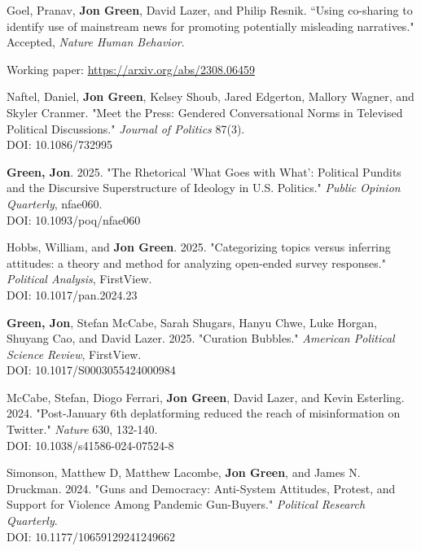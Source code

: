 \documentclass[letterpaper]{article}
\renewenvironment{itemize}{
  \begin{list}{}{
    \setlength{\leftmargin}{1.5em}
  }
}{
  \end{list}
}
\begin{document}
\begin{etaremune}

\item Goel, Pranav, \textbf{Jon Green}, David Lazer, and Philip Resnik. ``Using co-sharing to identify use of mainstream news for promoting potentially misleading narratives." Accepted, \textit{Nature Human Behavior}.
\begin{itemize}
\item Working paper: \url{https://arxiv.org/abs/2308.06459}
\end{itemize}

\item Naftel, Daniel, \textbf{Jon Green}, Kelsey Shoub, Jared Edgerton, Mallory Wagner, and Skyler Cranmer. "Meet the Press: Gendered Conversational Norms in Televised Political Discussions." \textit{Journal of Politics} 87(3).\\
DOI: 10.1086/732995

\item \textbf{Green, Jon}. 2025. "The Rhetorical 'What Goes with What': Political Pundits and the Discursive Superstructure of Ideology in U.S. Politics." \textit{Public Opinion Quarterly}, nfae060.\\
DOI: 10.1093/poq/nfae060

\item Hobbs, William, and \textbf{Jon Green}. 2025. "Categorizing topics versus inferring attitudes: a theory and method for analyzing open-ended survey responses." \textit{Political Analysis}, FirstView.\\
DOI: 10.1017/pan.2024.23

\item \textbf{Green, Jon}, Stefan McCabe, Sarah Shugars, Hanyu Chwe, Luke Horgan, Shuyang Cao, and David Lazer. 2025. "Curation Bubbles." \textit{American Political Science Review}, FirstView.\\
DOI: 10.1017/S0003055424000984

\item McCabe, Stefan, Diogo Ferrari, \textbf{Jon Green}, David Lazer, and Kevin Esterling. 2024. "Post-January 6th deplatforming reduced the reach of misinformation on Twitter." \textit{Nature} 630, 132-140. \\
DOI: 10.1038/s41586-024-07524-8

\item Simonson, Matthew D, Matthew Lacombe, \textbf{Jon Green}, and James N. Druckman. 2024. "Guns and Democracy: Anti-System Attitudes, Protest, and Support for Violence Among Pandemic Gun-Buyers." \textit{Political Research Quarterly}. \\
DOI: 10.1177/10659129241249662


\end{etaremune}
\end{document}
